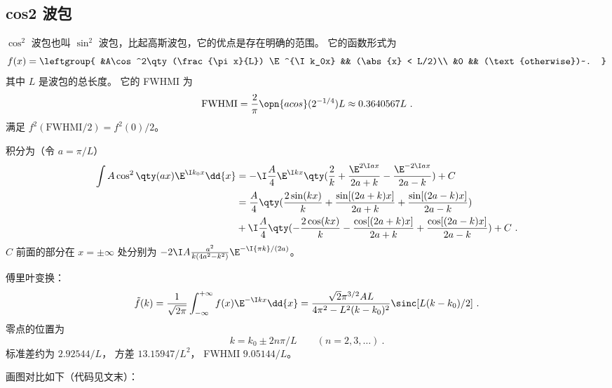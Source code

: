 
\subsection{cos2 波包}
$\cos^2$ 波包也叫 $\sin^2$ 波包，比起高斯波包，它的优点是存在明确的范围。 它的函数形式为
\begin{equation}\label{eq_cos2wp_5}
f(x) = \leftgroup{
&A\cos^2\qty(\frac{\pi x}{L}) \E^{\I k_0x} && (\abs{x} < L/2)\\
&0 && (\text{otherwise})~.
}\end{equation}
其中 $L$ 是波包的总长度。 它的 FWHMI 为
\begin{equation}\label{eq_cos2wp_4} %
\text{FWHMI} = \frac{2}{\pi}\opn{acos}(2^{-1/4}) L \approx 0.3640567 L~.
\end{equation}
满足 $f^2(\text{FWHMI/2}) = f^2(0)/2$。

积分为（令 $a = \pi/L$）
\begin{equation}\label{eq_cos2wp_2} %
\begin{aligned}
\int A\cos^2\qty(a x) \E^{\I k_0x} \dd{x} &= -\I\frac{A}{4}\E^{\I kx}\qty(\frac{2}{k} +\frac{\E^{2\I ax}}{2a+k} -\frac{\E^{-2\I ax}}{2a-k}) + C\\
&= \frac{A}{4} \qty(\frac{2\sin(k x)}{k} +\frac{\sin[(2 a+k)x]}{2 a+k} +\frac{\sin[(2 a-k)x]}{2 a-k})\\
&+\I\frac{A}{4} \qty(-\frac{2\cos(k x)}{k} -\frac{\cos[(2 a+k)x]}{2 a+k} +\frac{\cos[(2 a-k)x]}{2 a-k}) + C~.
\end{aligned}
\end{equation}
$C$ 前面的部分在 $x = \pm\infty$ 处分别为 $-2\I A\frac{a^2}{k(4 a^2 -k^2)}\E^{-\I{\pi k}/{(2a)}}$。

傅里叶变换：
\begin{equation} %
\tilde f(k) = \frac{1}{\sqrt{2\pi}} \int_{-\infty}^{+\infty} f(x) \E^{-\I k x} \dd{x}
= \frac{\sqrt{2} \pi ^{3/2} A L}{4 \pi ^2-L^2 (k-k_0)^2} \sinc[L(k-k_0)/2]~.
\end{equation}
零点的位置为
\begin{equation} %
k = k_0 \pm 2n\pi/L \qquad (n=2,3,\dots)~.
\end{equation}
标准差约为 $2.92544/L$， 方差 $13.15947/L^2$， FWHMI $9.05144/L$。

画图对比如下（代码见文末）：


